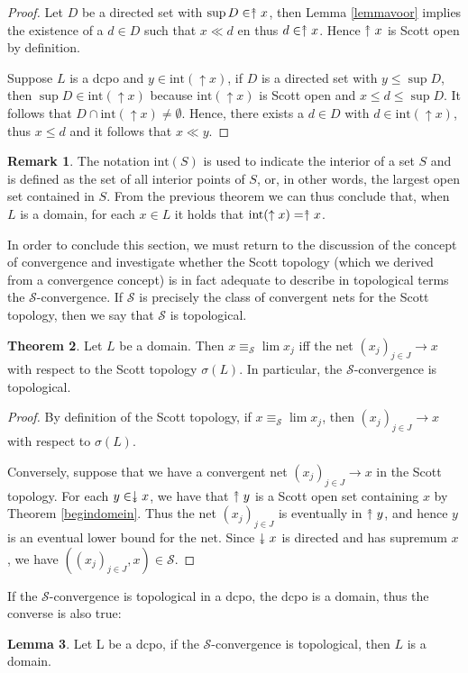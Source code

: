 \documentclass[a4paper,12pt]{article}
\newcommand{\upuparrow}{\mathrel{\reflectbox{\rotatebox[origin=c]{90}{$\twoheadrightarrow$}}}}
\newcommand{\downdownarrow}{\mathrel{\reflectbox{\rotatebox[origin=c]{90}{$\twoheadleftarrow$}}}}
\theoremstyle{definition}
\newtheorem{theorem}{Theorem}[section]
\newtheorem{lemma}[theorem]{Lemma}
\newtheorem{remark}[theorem]{Remark}
\renewcommand{\int}{\text{int}}
\begin{document}
\begin{proof}
Let $D$ be a directed set with $\sup D \in \upuparrow x$, then Lemma \ref{lemmavoor} implies the existence of a $d \in D$ such that $x \ll d$ en thus $d \in \upuparrow x$. Hence $\upuparrow x$ is Scott open by definition.

Suppose $L$ is a dcpo and $y \in \int(\uparrow x)$, if $D$ is a directed set with $y \leq \sup D$, then $\sup D \in \int(\uparrow x)$ because $\int(\uparrow x)$ is Scott open and $x \leq d \leq \sup D$. It follows that $D \cap \int(\uparrow x) \neq \emptyset$. Hence, there exists a $d \in D$ with $d \in \int(\uparrow x)$, thus $x \leq d$ and it follows that $x \ll y$.
\end{proof}
\begin{remark}
The notation $\int(S)$ is used to indicate the interior of a set $S$ and is defined as the set of all interior points of $S$, or, in other words, the largest  open set contained in $S$. From the previous theorem we can thus conclude that, when $L$ is a domain, for each $x \in L$ it holds that $\int(\uparrow x) = \upuparrow x$.
\end{remark}
In order to conclude this section, we must return to the discussion of the concept of convergence and investigate whether the Scott topology (which we derived from a convergence concept) is in fact adequate to describe in topological terms the $\mathcal{S}$-convergence. If $\mathcal{S}$ is precisely the class of convergent nets for the Scott topology, then we say that $\mathcal{S}$ is topological.

\begin{theorem}
Let $L$ be a domain. Then $x \equiv_{\mathcal{S}} \lim x_j$ iff the net $(x_j)_{j\in J} \rightarrow x$ with respect to the Scott topology $\sigma(L)$. In particular, the $\mathcal{S}$-convergence is topological.
\end{theorem}
\begin{proof}
By definition of the Scott topology, if $x \equiv_{\mathcal{S}} \lim x_j$, then $(x_j)_{j\in J} \rightarrow x$ with respect to $\sigma(L)$.
 
Conversely, suppose that we have a convergent net $(x_j)_{j\in J} \rightarrow x$ in the Scott topology. For each $y \in \downdownarrow x$, we have that $\upuparrow y$ is a Scott open set containing $x$ by Theorem \ref{begindomein}. Thus the net $(x_j)_{j\in J}$ is eventually in $\upuparrow y$, and hence $y$ is an eventual lower bound for the net. Since $\downdownarrow x$ is directed and has supremum $x$, we have $((x_j)_{j\in J}, x) \in \mathcal{S}$.
\end{proof}
If the $\mathcal{S}$-convergence is topological in a dcpo, the dcpo is a domain, thus the converse is also true:
\begin{lemma}
Let L be a dcpo, if the $\mathcal{S}$-convergence is topological, then $L$ is a domain.
\end{lemma}
\end{document}
